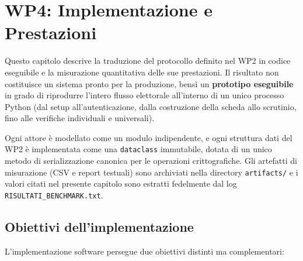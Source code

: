 
\chapter{WP4: Implementazione e Prestazioni}
\label{ch:wp4}


Questo capitolo descrive la traduzione del protocollo definito nel WP2 in codice eseguibile e la misurazione quantitativa delle sue prestazioni. Il risultato non costituisce un sistema pronto per la produzione, bensì un \textbf{prototipo eseguibile} in grado di riprodurre l'intero flusso elettorale all'interno di un unico processo Python (dal setup all'autenticazione, dalla costruzione della scheda allo scrutinio, fino alle verifiche individuali e universali).

Ogni attore è modellato come un modulo indipendente, e ogni struttura dati del WP2 è implementata come una \texttt{dataclass} immutabile, dotata di un unico metodo di serializzazione canonica per le operazioni crittografiche. Gli artefatti di misurazione (CSV e report testuali) sono archiviati nella directory \texttt{artifacts/} e i valori citati nel presente capitolo sono estratti fedelmente dal log \texttt{RISULTATI\_BENCHMARK.txt}.

\section{Obiettivi dell'implementazione}
\label{sec:wp4_obiettivi}

L'implementazione software persegue due obiettivi distinti ma complementari:

